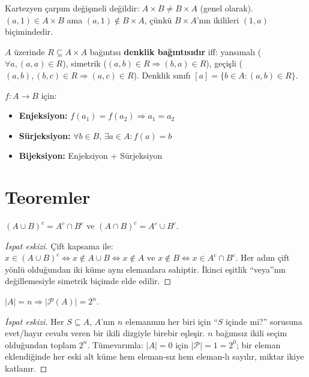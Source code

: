\begin{karsiornek}
Kartezyen çarpım değişmeli değildir: $A\times B \ne B\times A$ (genel olarak).
$(a,1)\in A\times B$ ama $(a,1)\notin B\times A$, çünkü $B\times A$'nın ikilileri
$(1,a)$ biçimindedir.
\end{karsiornek}

\begin{definition}
$A$ üzerinde $R \subseteq A \times A$ bağıntısı \textbf{denklik bağıntısıdır} iff:
yansımalı ($\forall a,(a,a)\in R$), simetrik ($(a,b)\in R\Rightarrow(b,a)\in R$),
geçişli ($(a,b),(b,c)\in R\Rightarrow(a,c)\in R$).
Denklik sınıfı $[a] = \{b \in A : (a,b) \in R\}$.
\end{definition}

\begin{definition}
$f: A \to B$ için:
\begin{itemize}
  \item \textbf{Enjeksiyon:} $f(a_1)=f(a_2) \Rightarrow a_1=a_2$
  \item \textbf{Sürjeksiyon:} $\forall b\in B,\, \exists a\in A: f(a)=b$
  \item \textbf{Bijeksiyon:} Enjeksiyon $+$ Sürjeksiyon
\end{itemize}
\end{definition}

\section{Teoremler}

\begin{theorem}[De Morgan]
$(A \cup B)^c = A^c \cap B^c$ ve $(A \cap B)^c = A^c \cup B^c$.
\end{theorem}

\begin{proof}[İspat eskizi]
Çift kapsama ile: $x \in (A\cup B)^c \Leftrightarrow x \notin A\cup B
\Leftrightarrow x\notin A \text{ ve } x\notin B \Leftrightarrow x\in A^c\cap B^c$.
Her adım çift yönlü olduğundan iki küme aynı elemanlara sahiptir. İkinci eşitlik
``veya''nın değillemesiyle simetrik biçimde elde edilir.
\end{proof}

\begin{theorem}
$|A| = n \Rightarrow |\mathcal{P}(A)| = 2^n$.
\end{theorem}

\begin{proof}[İspat eskizi]
Her $S\subseteq A$, $A$'nın $n$ elemanının her biri için ``$S$ içinde mi?''
sorusuna evet/hayır cevabı veren bir ikili dizgiyle birebir eşleşir. $n$
bağımsız ikili seçim olduğundan toplam $2^n$. Tümevarımla: $|A|=0$ için
$|\mathcal{P}|=1=2^0$; bir eleman eklendiğinde her eski alt küme hem eleman-sız
hem eleman-lı sayılır, miktar ikiye katlanır.
\end{proof}

